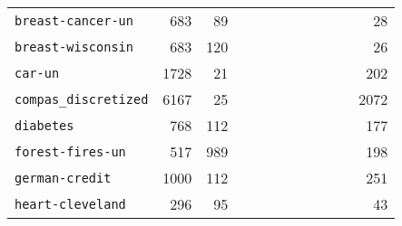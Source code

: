 \begin{tabular}{lccrrrrrrrrr}
\texttt{breast-cancer-un} & \multicolumn{1}{r}{683} & \multicolumn{1}{r}{89}  & \cellcolor{TealBlue!30}{24} & \cellcolor{TealBlue!30}{24} & \cellcolor{TealBlue!30}{24} & \cellcolor{TealBlue!30}{24} & \cellcolor{TealBlue!30}{24} & \cellcolor{TealBlue!30}{24} & \cellcolor{TealBlue!30}{24} & \cellcolor{TealBlue!30}{24} & 28\\
\texttt{breast-wisconsin} & \multicolumn{1}{r}{683} & \multicolumn{1}{r}{120}  & \cellcolor{TealBlue!30}{15} & \cellcolor{TealBlue!30}{15} & \cellcolor{TealBlue!30}{15} & \cellcolor{TealBlue!30}{15} & \cellcolor{TealBlue!30}{15} & \cellcolor{TealBlue!30}{15} & \cellcolor{TealBlue!30}{15} & \cellcolor{TealBlue!30}{15} & 26\\
\texttt{car-un} & \multicolumn{1}{r}{1728} & \multicolumn{1}{r}{21}  & \cellcolor{TealBlue!30}{192} & \cellcolor{TealBlue!30}{192} & \cellcolor{TealBlue!30}{192} & \cellcolor{TealBlue!30}{192} & \cellcolor{TealBlue!30}{192} & \cellcolor{TealBlue!30}{192} & \cellcolor{TealBlue!30}{192} & \cellcolor{TealBlue!30}{192} & 202\\
\texttt{compas\_discretized} & \multicolumn{1}{r}{6167} & \multicolumn{1}{r}{25}  & \cellcolor{TealBlue!30}{2004} & \cellcolor{TealBlue!30}{2004} & \cellcolor{TealBlue!30}{2004} & \cellcolor{TealBlue!30}{2004} & \cellcolor{TealBlue!30}{2004} & \cellcolor{TealBlue!30}{2004} & \cellcolor{TealBlue!30}{2004} & \cellcolor{TealBlue!30}{2004} & 2072\\
\texttt{diabetes} & \multicolumn{1}{r}{768} & \multicolumn{1}{r}{112}  & \cellcolor{TealBlue!30}{162} & \cellcolor{TealBlue!30}{162} & \cellcolor{TealBlue!30}{162} & \cellcolor{TealBlue!30}{162} & \cellcolor{TealBlue!30}{162} & \cellcolor{TealBlue!30}{162} & \cellcolor{TealBlue!30}{162} & \cellcolor{TealBlue!30}{162} & 177\\
\texttt{forest-fires-un} & \multicolumn{1}{r}{517} & \multicolumn{1}{r}{989}  & \cellcolor{TealBlue!30}{194} & \cellcolor{TealBlue!30}{194} & \cellcolor{TealBlue!30}{193} & \cellcolor{TealBlue!30}{193} & \cellcolor{TealBlue!30}{194} & \cellcolor{TealBlue!30}{194} & \cellcolor{TealBlue!30}{193} & \cellcolor{TealBlue!30}{193} & 198\\
\texttt{german-credit} & \multicolumn{1}{r}{1000} & \multicolumn{1}{r}{112}  & \cellcolor{TealBlue!30}{236} & \cellcolor{TealBlue!30}{236} & \cellcolor{TealBlue!30}{236} & \cellcolor{TealBlue!30}{236} & \cellcolor{TealBlue!30}{236} & \cellcolor{TealBlue!30}{236} & \cellcolor{TealBlue!30}{236} & \cellcolor{TealBlue!30}{236} & 251\\
\texttt{heart-cleveland} & \multicolumn{1}{r}{296} & \multicolumn{1}{r}{95}  & \cellcolor{TealBlue!30}{41} & \cellcolor{TealBlue!30}{41} & \cellcolor{TealBlue!30}{41} & \cellcolor{TealBlue!30}{41} & \cellcolor{TealBlue!30}{41} & \cellcolor{TealBlue!30}{41} & \cellcolor{TealBlue!30}{41} & \cellcolor{TealBlue!30}{41} & 43\\

\end{tabular}
